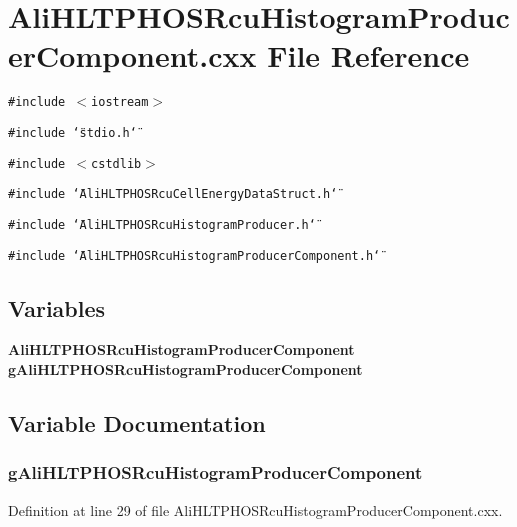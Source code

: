 \section{Ali\-HLTPHOSRcu\-Histogram\-Producer\-Component.cxx File Reference}
\label{AliHLTPHOSRcuHistogramProducerComponent_8cxx}


{\tt \#include $<$iostream$>$}\par
{\tt \#include \char`\"{}stdio.h\char`\"{}}\par
{\tt \#include $<$cstdlib$>$}\par
{\tt \#include \char`\"{}Ali\-HLTPHOSRcu\-Cell\-Energy\-Data\-Struct.h\char`\"{}}\par
{\tt \#include \char`\"{}Ali\-HLTPHOSRcu\-Histogram\-Producer.h\char`\"{}}\par
{\tt \#include \char`\"{}Ali\-HLTPHOSRcu\-Histogram\-Producer\-Component.h\char`\"{}}\par
\subsection*{Variables}
\begin{CompactItemize}
\item 
{\bf Ali\-HLTPHOSRcu\-Histogram\-Producer\-Component} {\bf g\-Ali\-HLTPHOSRcu\-Histogram\-Producer\-Component}
\end{CompactItemize}


\subsection{Variable Documentation}
\subsubsection{ {\bf g\-Ali\-HLTPHOSRcu\-Histogram\-Producer\-Component}}\label{AliHLTPHOSRcuHistogramProducerComponent_8cxx_a0}




Definition at line 29 of file Ali\-HLTPHOSRcu\-Histogram\-Producer\-Component.cxx.